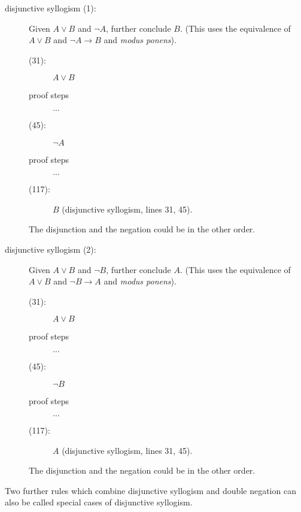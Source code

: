 \documentclass[12pt]{article}
\begin{document}
\begin{description}

\item[disjunctive syllogism (1):] Given $A \vee B$ and $\neg A$,
further conclude $B$.  (This uses the equivalence of $A \vee B$ and
$\neg A \rightarrow B$ and {\em modus ponens\/}).

\begin{description}

\item[(31):]  $A \vee B$

\item[proof steps]  $\ldots$

\item[(45):]  $\neg A$

\item[proof steps]  $\ldots$

\item[(117):]  $B$  (disjunctive syllogism, lines 31, 45).

\end{description}

The disjunction and the negation could be in the other order.

\item[disjunctive syllogism (2):] Given $A \vee B$ and $\neg B$,
further conclude $A$.  (This uses the equivalence of $A \vee B$ and
$\neg B \rightarrow A$ and {\em modus ponens\/}).

\begin{description}

\item[(31):]  $A \vee B$

\item[proof steps]  $\ldots$

\item[(45):]  $\neg B$

\item[proof steps]  $\ldots$

\item[(117):]  $A$  (disjunctive syllogism, lines 31, 45).

\end{description}

The disjunction and the negation could be in the other order.

\end{description}

Two further rules which combine disjunctive syllogism and double negation can also be called special cases of disjunctive syllogism.
\end{document}
